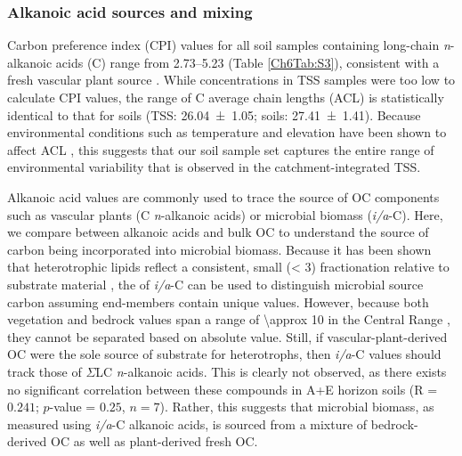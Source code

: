 \subsubsection{Alkanoic acid sources and mixing}\label{Ch6SD5}

Carbon preference index (CPI) values for all soil samples containing long-chain \textit{n}-alkanoic acids (C) range from \numrange{2.73}{5.23} (Table \ref{Ch6Tab:S3}), consistent with a fresh vascular plant source \citep{Eglinton:1967uz}. While concentrations in TSS samples were too low to calculate CPI values, the range of C average chain lengths (ACL) is statistically identical to that for soils (TSS: \num{26.04 \pm 1.05}; soils: \num{27.41 \pm 1.41}). Because environmental conditions such as temperature and elevation have been shown to affect ACL \citep{Bush:2013ie}, this suggests that our soil sample set captures the entire range of environmental variability that is observed in the catchment-integrated TSS.

Alkanoic acid  values are commonly used to trace the source of OC components such as vascular plants (C \textit{n}-alkanoic acids) or microbial biomass (\textit{i/a}-C). Here, we compare  between alkanoic acids and bulk OC to understand the source of carbon being incorporated into microbial biomass. Because it has been shown that heterotrophic lipids reflect a consistent, small (\SI{< 3}{\permil})  fractionation relative to substrate material \citep{Blair:1985ti}, the  of \textit{i/a}-C can be used to distinguish microbial source carbon assuming end-members contain unique  values. However, because both vegetation and bedrock  values span a range of \SI{\approx 10}{\permil} in the Central Range \citep{Hilton:2010cg,Hilton:2013kq}, they cannot be separated based on absolute value. Still, if vascular-plant-derived OC were the sole source of substrate for heterotrophs, then \textit{i/a}-C  values should track those of $\Sigma$LC \textit{n}-alkanoic acids. This is clearly not observed, as there exists no significant correlation between these compounds in A+E horizon soils (R = $0.241$; $p$-value = $0.25$, $n = 7$). Rather, this suggests that microbial biomass, as measured using \textit{i/a}-C alkanoic acids, is sourced from a mixture of bedrock-derived OC as well as plant-derived fresh OC.

\clearpage

